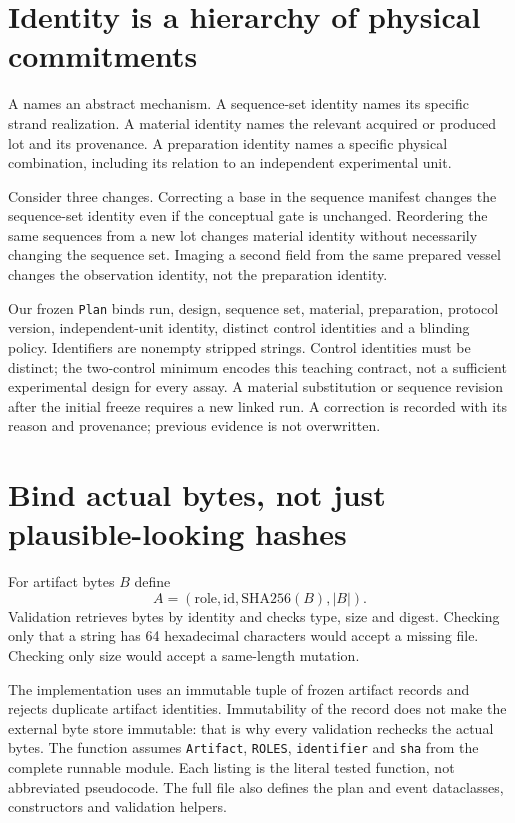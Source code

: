 \section{Identity is a hierarchy of physical commitments}
A  names an abstract mechanism. A sequence-set identity names
its specific strand realization. A material identity names the relevant acquired
or produced lot and its provenance. A preparation identity names a specific
physical combination, including its relation to an independent experimental unit.

Consider three changes. Correcting a base in the sequence manifest changes the
sequence-set identity even if the conceptual gate is unchanged. Reordering the
same sequences from a new lot changes material identity without necessarily
changing the sequence set. Imaging a second field from the same prepared vessel
changes the observation identity, not the preparation identity.

Our frozen \texttt{Plan} binds run, design, sequence set, material, preparation,
protocol version, independent-unit identity, distinct control identities and a
blinding policy. Identifiers are nonempty stripped strings. Control identities
must be distinct; the two-control minimum encodes this teaching contract, not
a sufficient experimental design for every assay. A material substitution or
sequence revision after the initial freeze requires a new linked run. A correction
is recorded with its reason and provenance; previous evidence is not overwritten.

\section{Bind actual bytes, not just plausible-looking hashes}
For artifact bytes $B$ define
\[
A=(\mathrm{role,id,SHA256}(B),|B|).
\]
Validation retrieves bytes by identity and checks type, size and digest. Checking
only that a string has 64 hexadecimal characters would accept a missing file.
Checking only size would accept a same-length mutation.

The implementation uses an immutable tuple of frozen artifact records and rejects
duplicate artifact identities. Immutability of the record does not make the external
byte store immutable: that is why every validation rechecks the actual bytes.
The function assumes \texttt{Artifact}, \texttt{ROLES}, \texttt{identifier} and
\texttt{sha} from the complete runnable module. Each listing is the literal tested
function, not abbreviated pseudocode. The full file also defines the plan and event
dataclasses, constructors and validation helpers.

